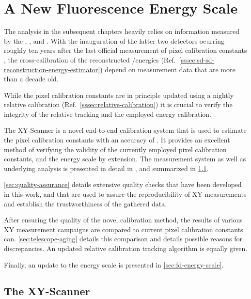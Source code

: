 \chapter{A New Fluorescence Energy Scale}
\label{chap:xy-scanner}

The analysis in the subsequent chapters heavily relies on information measured 
by the \WCD, \SSD, and \UMD. With the inauguration of the latter two detectors 
ocurring roughly ten years after the last official measurement of \FD pixel 
calibration constants \cite{dorofeevFDAbsoluteCalibration2013}, the 
cross-calibration of the reconstructed \UMD/\SSD energies (Ref.\ 
\cref{sssec:sd-sd-reconstruction-energy-estimator}) depend on measurement data 
that are more than a decade old. 

While the pixel calibration constants are in principle updated using a nightly 
relative calibration (Ref.~\cref{sssec:relative-calibration}) it is crucial to 
verify the integrity of the relative tracking and the employed energy 
calibration.

The XY-Scanner is a novel end-to-end calibration system that is used to estimate
the \FD pixel calibration constants with an accuracy of \todo{uncertainty}. It 
provides an excellent method of verifying the validity of the currently employed
pixel calibration constants, and the \FD energy scale by extension. The 
measurement system as well as underlying analysis is presented in detail in 
\cite{schaferXYScannerVersatileMethod2023}, and summarized in 
\cref{sec:xy-scanner}.

\cref{sec:quality-assurance} details extensive quality checks that have been
developed in this work, and that are used to assure the reproducibility of XY 
measurements and establish the trustworthiness of the gathered data.

After ensuring the quality of the novel calibration method, the results of 
various XY measurement campaigns are compared to current pixel calibration 
constants can. \cref{sec:telescope-aging} details this comparison and details
possible reasons for discrepancies. An updated relative calibration tracking 
algorithm is equally given.

Finally, an update to the \FD energy scale is presented in 
\cref{sec:fd-energy-scale}.

\section{The XY-Scanner}
\label{sec:xy-scanner}

